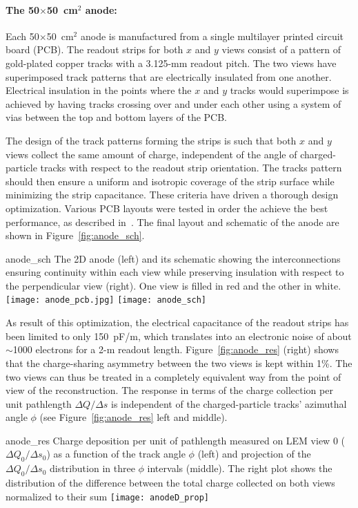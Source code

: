  \paragraph{The 50$\times$50~cm$^2$ anode:}

Each  50$\times$50~cm$^2$ anode is manufactured from a single multilayer printed circuit
board (PCB). The readout strips for both $x$ and $y$ views consist of a pattern of
gold-plated copper tracks 
with a 3.125-mm readout pitch. The two views have superimposed track patterns
that are  electrically insulated from one another. Electrical insulation in the points where
the $x$ and $y$ tracks would superimpose is achieved by having tracks crossing
over and under each other using a system of vias between the top and bottom layers of the PCB.
 
The design of the track patterns forming the strips is such that both $x$ and $y$ views
collect the same amount of charge, independent of the angle of
charged-particle tracks with respect to the readout strip
orientation. The tracks pattern should then ensure a uniform and isotropic coverage of the strip surface while 
minimizing the strip capacitance. These criteria have driven a thorough design optimization.  
Various PCB layouts were tested in order the achieve the best performance, as described in~\cite{Cantini:2013yba}. 
The final layout and schematic of the anode are shown in Figure~\ref{fig:anode_sch}. 

\begin{cdrfigure}{anode_sch}
{The 2D anode (left) and its schematic showing the  interconnections  ensuring continuity within each view while preserving insulation
with respect to the perpendicular view  (right). One view is filled  in red and the other in white.}
\texttt{[image: anode\_pcb.jpg]} \hspace{0.2cm} \texttt{[image: anode\_sch]}
\end{cdrfigure}

As result of this optimization, the electrical capacitance of the
readout strips has been limited to only 150~pF/m, which translates
into an electronic noise of about $\sim$1000 electrons for a 2-m readout
length.  Figure~\ref{fig:anode_res} (right) shows that the
charge-sharing asymmetry between the two views is kept within 1\%. 
The two views can thus be treated in a completely equivalent way
from the point of view of the reconstruction. The response in terms of
the charge collection per unit pathlength $\Delta Q/\Delta s$ is
independent of the charged-particle tracks' azimuthal angle $\phi$
(see Figure~\ref{fig:anode_res} left and middle).
\begin{cdrfigure}{anode_res} {Charge deposition per unit of pathlength measured on LEM view 0 
($\Delta Q_0/\Delta s_0$) as a function  of the track angle $\phi$ (left) and  projection of the  $\Delta Q_0/\Delta s_0$ distribution in three $\phi$ intervals (middle).  The right plot  shows the distribution of the difference between the total charge  collected on both views normalized to their sum}
\texttt{[image: anodeD\_prop]}
\end{cdrfigure}

